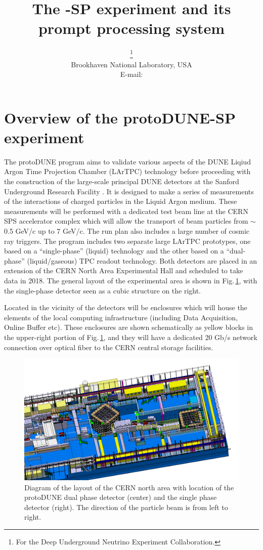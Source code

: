 \documentclass{PoS}
\title{The \pd-SP experiment and its prompt processing system}
\author{\speaker{Maxim Potekhin}\thanks{For the Deep Underground Neutrino Experiment Collaboration.}\\
        Brookhaven National Laboratory, USA\\
        E-mail: \email{potekhin@bnl.gov}}
\newcommand{\pd}{protoDUNE\xspace}
\begin{document}
\section{Overview of the protoDUNE-SP experiment}
The \pd program aims to validate various aspects of the DUNE  Liqiud Argon Time Projection Chamber (LArTPC)  technology 
before proceeding with the construction of the large-scale principal DUNE detectors at the Sanford Underground Research
Facility \cite{cdrVol1, cdrVol4}. It  is designed to make a series of measurements of the interactions of
charged particles in the Liquid Argon medium.  These measurements will be performed with a dedicated test
beam line  at the CERN SPS accelerator complex which will allow the transport of beam particles from $\sim$0.5 GeV/c
up to 7 GeV/c. The run plan also includes a large number of cosmic ray triggers. The program includes
two separate large LArTPC prototypes, one based on a ``single-phase'' (liquid) technology and
the other based on a ``dual-phase'' (liquid/gaseous) TPC readout technology.
Both detectors are placed in an extension of the CERN North Area Experimental Hall and  scheduled
to take data in 2018. The general layout of the experimental area is shown in Fig.\,\ref{fig:np02np04}, with
the single-phase detector seen as a cubic structure on the right.

Located in the vicinity of the detectors will be enclosures which will house the elements of the local computing infrastructure
(including Data Acquisition, Online Buffer etc). These enclosures are shown schematically as yellow blocks in the
upper-right portion of Fig.\,\ref{fig:np02np04}, and they will have a dedicated 20 Gb/s
network connection over optical fiber to the CERN central storage facilities.

\begin{figure}[tb]
\centering\includegraphics[width=1.0\textwidth]{np02np04.png}
\caption{\label{fig:np02np04}Diagram of the layout of the CERN north area with
  location of the protoDUNE dual phase detector (center) and the single
  phase detector (right). The direction of the particle beam is from left to right.}
\end{figure}
\end{document}
